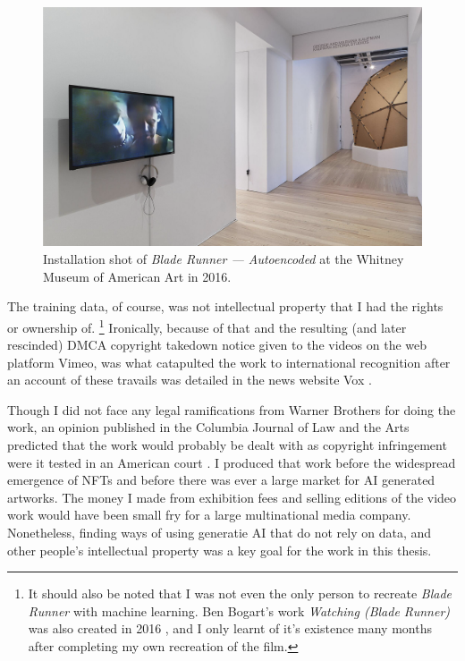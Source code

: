 \begin{figure}[!htb]
    \centering
    \captionsetup{justification=centering}
    \includegraphics[width=1\textwidth]{figures/c1_intro/whitney-installation-shot.png}
    \caption{Installation shot of \textit{Blade Runner --- Autoencoded} at the Whitney Museum of American Art in 2016.}
    \label{fig:c1:blade-runner-whitney}
\end{figure}

The training data, of course, was not intellectual property that I had the rights or ownership of. \footnote{It should also be noted that I was not even the only person to recreate \textit{Blade Runner} with machine learning. Ben Bogart's work \textit{Watching (Blade Runner)} was also created in 2016 \citep{bogart2016watching}, and I only learnt of it's existence many months after completing my own recreation of the film.}
Ironically, because of that and the resulting (and later rescinded) DMCA copyright takedown notice given to the videos on the web platform Vimeo, was what catapulted the work to international recognition after an account of these travails was detailed in the news website Vox \citep{romano2016bladerunner}.

Though I did not face any legal ramifications from Warner Brothers for doing the work, an opinion published in the Columbia Journal of Law and the Arts predicted that the work would probably be dealt with as copyright infringement were it tested in an American court \citep{sobel2017artificial}. 
I produced that work before the widespread emergence of NFTs and before there was ever a large market for AI generated artworks. 
The money I made from exhibition fees and selling editions of the video work would have been small fry for a large multinational media company. 
Nonetheless, finding ways of using generatie AI that do not rely on data, and other people's intellectual property was a key goal for the work in this thesis.


